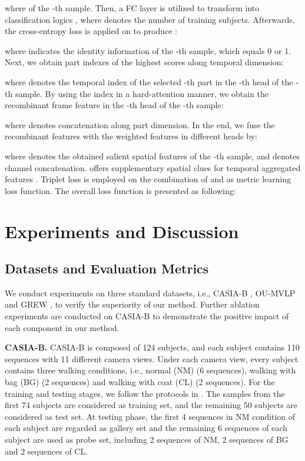 \documentclass[journal]{IEEEtran}
\begin{document}
  
 where  of the -th sample.
 Then, a FC layer is utilized to transform  into classification logics , where  denotes the number of training subjects. Afterwards, the cross-entropy loss is applied on  to produce :
 
 where  indicates the identity information of the -th sample, which equals 0 or 1.
 Next, we obtain part indexes of the highest scores along temporal dimension:
 
 where  denotes the temporal index of the selected -th part in the -th head of the -th sample. By using the index  in a hard-attention manner, we obtain the recombinant frame feature  in the -th head of the -th sample:
 
 where  denotes concatenation along part dimension. In the end, we fuse the recombinant features  with the weighted features  in different heads by:
 
 where  denotes the obtained salient spatial features of the -th sample, and  denotes channel concatenation.  offers supplementary spatial clues for temporal aggregated features . Triplet loss \cite{hermans2017defense} is employed on the combination of  and  as metric learning loss function. The overall loss function is presented as following:
 
 
 
\section{Experiments and Discussion}
\label{experiments_and_discussion}
 \subsection{Datasets and Evaluation Metrics}
 We conduct experiments on three standard datasets, i.e., CASIA-B \cite{yu2006framework}, OU-MVLP \cite{takemura2018multi} and GREW \cite{grew}, to verify the superiority of our method. Further ablation experiments are conducted on CASIA-B to demonstrate the positive impact of each component in our method.
 
\noindent \textbf{CASIA-B.} CASIA-B \cite{yu2006framework} is composed of 124 subjects, and each subject contains 110 sequences with 11 different camera views. Under each camera view, every subject contains three walking conditions, i.e., normal (NM) (6 sequences), walking with bag (BG) (2 sequences) and walking with coat (CL) (2 sequences). For the training and testing stages, we follow the protocols in \cite{wu2016comprehensive}. The samples from the first 74 subjects are considered as training set, and the remaining 50 subjects are considered as test set. At testing phase, the first 4 sequences in NM condition of each subject are regarded as gallery set and the remaining 6 sequences of each subject are used as probe set, including 2 sequences of NM, 2 sequences of BG and 2 sequences of CL.
\end{document}
